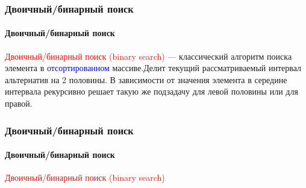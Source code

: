 \documentclass[aspectratio=169]{beamer}
\begin{document}
\begin{frame}
\frametitle{Двоичный/бинарный поиск}
\framesubtitle{Двоичный/бинарный поиск}
\justifying
\textcolor{red}{Двоичный/бинарный поиск (binary search)} — классический алгоритм поиска элемента в \textcolor{blue}{отсортированном} массиве.\newline\newline Делит текущий рассматриваемый интервал альтернатив на 2 половины. В зависимости от значения элемента в середине интервала рекурсивно решает такую же подзадачу для левой половины или для правой.


\begin{figure}
    \captionsetup[subfigure]{labelformat=empty}
    \centering
\end{figure}
\end{frame}

\begin{frame}
\frametitle{Двоичный/бинарный поиск}
\framesubtitle{Двоичный/бинарный поиск}
\justifying
\textcolor{red}{Двоичный/бинарный поиск (binary search)}
\begin{figure}
    \captionsetup[subfigure]{labelformat=empty}
    \centering
\end{figure}
\end{frame}
\end{document}
